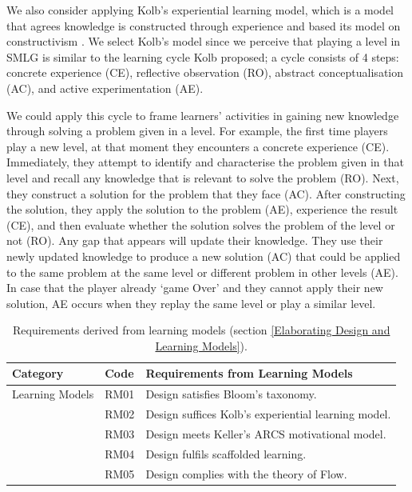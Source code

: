 \documentclass[12pt, a4paper]{report}
\begin{document}
{We also consider applying Kolb's experiential learning model, which is a model that agrees knowledge is constructed through experience and based its model on constructivism \cite{kolb2014experiential}. We select Kolb's model since we perceive that playing a level in SMLG is similar to the learning cycle Kolb proposed; a cycle consists of 4 steps: concrete experience (CE), reflective observation (RO), abstract conceptualisation (AC), and active experimentation (AE). 

We could apply this cycle to frame learners' activities in gaining new knowledge through solving a problem given in a level. For example, the first time players play a new level, at that moment they encounters a concrete experience (CE). Immediately, they attempt to identify and characterise the problem given in that level and recall any knowledge that is relevant to solve the problem (RO). Next, they construct a solution for the problem that they face (AC). After constructing the solution, they apply the solution to the problem (AE), experience the result (CE), and then evaluate whether the solution solves the problem of the level or not (RO). Any gap that appears will update their knowledge. They use their newly updated knowledge to produce a new solution (AC) that could be applied to the same problem at the same level or different problem in other levels (AE). In case that the player already `game Over' and they cannot apply their new solution, AE occurs when they replay the same level or play a similar level.

\begin{table}[ht]
\caption{Requirements derived from learning models (section \ref{Elaborating Design and Learning Models}).}
\label{design-learning-models}
\begin{center}
\begin{tabular}{ p{2cm}p{1cm}p{10cm} } 
\hline
Category & Code & Requirements from Learning Models \\
\hline
\multirow{1}{2cm}{Learning Models} 
& RM01 & Design satisfies Bloom's taxonomy. \\
& RM02 & Design suffices Kolb's experiential learning model. \\ 
& RM03 & Design meets Keller's ARCS motivational model. \\
& RM04 & Design fulfils scaffolded learning. \\
& RM05 & Design complies with the theory of Flow. \\ 
\hline
\end{tabular}
\end{center}
\end{table}

}
\end{document}
